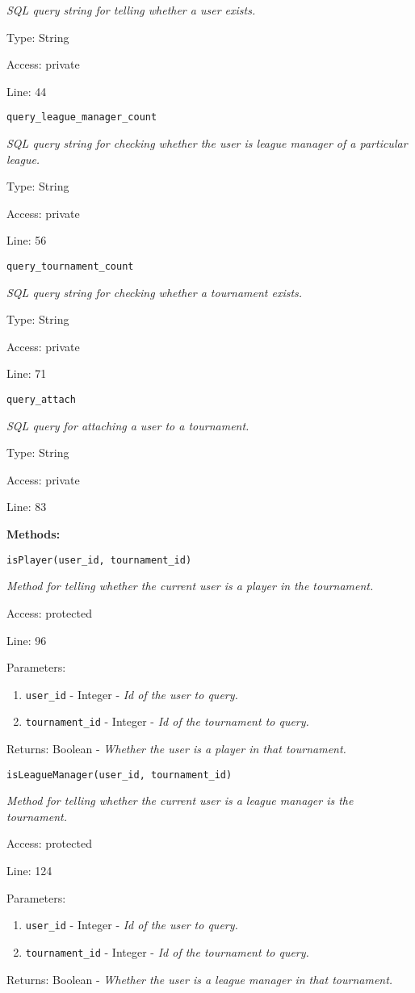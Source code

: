 {\scriptsize
\textit{SQL query string for telling whether a user exists.}

Type: String

Access: private

Line: 44

}
\texttt{query\_league\_manager\_count}

{\scriptsize
\textit{SQL query string for checking whether the user is league manager of a particular league.}

Type: String

Access: private

Line: 56

}
\texttt{query\_tournament\_count}

{\scriptsize
\textit{SQL query string for checking whether a tournament exists.}

Type: String

Access: private

Line: 71

}
\texttt{query\_attach}

{\scriptsize
\textit{SQL query for attaching a user to a tournament.}

Type: String

Access: private

Line: 83

}
\textbf{Methods:}

\texttt{isPlayer(user\_id, tournament\_id)}

{\scriptsize
\textit{Method for telling whether the current user is a player in the tournament.}

Access: protected

Line: 96

Parameters:

\begin{enumerate}
\item \texttt{user\_id} - Integer - \textit{Id of the user to query.}
\item \texttt{tournament\_id} - Integer - \textit{Id of the tournament to query.}
\end{enumerate}
Returns: Boolean - \textit{Whether the user is a player in that tournament.}

}

\texttt{isLeagueManager(user\_id, tournament\_id)}

{\scriptsize
\textit{Method for telling whether the current user is a league manager is the tournament.}

Access: protected

Line: 124

Parameters:

\begin{enumerate}
\item \texttt{user\_id} - Integer - \textit{Id of the user to query.}
\item \texttt{tournament\_id} - Integer - \textit{Id of the tournament to query.}
\end{enumerate}
Returns: Boolean - \textit{Whether the user is a league manager in that tournament.}

}

